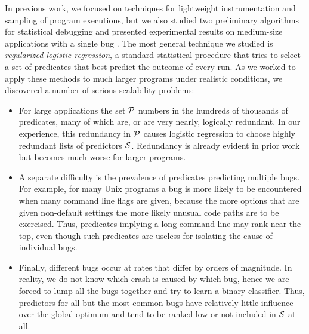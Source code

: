 \documentclass[draft]{sig-alternate}
\newcommand{\termdef}[1]{\emph{#1}}
\newcommand{\issue}[2][]{}
\begin{document}
In previous work, we focused on techniques
for lightweight instrumentation and sampling of program executions, but
we also studied two preliminary algorithms for statistical debugging and
presented experimental results on medium-size applications with a
single bug \cite{PLDI`03*141,NIPS2003_AP05}.  The most general
technique we studied is \termdef{regularized logistic regression}, a standard
statistical procedure that tries to select a set of predicates that
best predict the outcome of every run. As we worked to apply these
methods to much larger programs under realistic conditions, we
discovered a number of serious scalability problems:

\begin{itemize}

\item For large applications the set ${\cal P}$ numbers in the hundreds of
thousands of predicates, many of which are, or are very nearly,
logically redundant.  In our experience, this redundancy in ${\cal P}$
causes logistic regression to choose highly redundant lists of
predictors ${\cal S}$.  Redundancy is
already evident in prior work \cite{PLDI`03*141} but becomes much
worse for larger programs.
\issue[Alice]{Logistic regression is not a global optimization
  technique.  The fact that predictors for less common bugs are ranked
  lower by logistic regression is a consequence of doing binary
  classification when we really should be doing multi-class
  classification.  But we can't do multi-class classification since we
  don't know the underlying bug labels. [text modified]}

\item A separate difficulty is the prevalence of predicates predicting
multiple bugs.  For example, for many Unix programs a bug is more
likely to be encountered when many command line flags are given,
because the more options that are given non-default settings the more
likely unusual code paths are to be exercised.  Thus, predicates
implying a long command line may rank near the top, even though such
predicates are useless for isolating the cause of individual bugs.

\item Finally, different bugs occur at rates that differ by orders of
magnitude.  In reality, we do not know which crash is caused by which bug, 
hence we are forced to lump all the bugs together and try to learn a binary
classifier.  Thus, predictors for all but the most common bugs have relatively little
influence over the global optimum and tend to be ranked low or not included 
in ${\cal S}$ at all.

\end{itemize}
\end{document}
